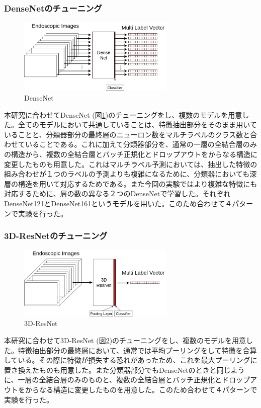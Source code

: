 \subsubsection{DenseNetのチューニング}

\begin{figure}[tb]
    \begin{center}
        \includegraphics[width=75mm]{./fig/ieice2.png}
        \caption{DenseNet}
        \label{fig:densenet}
    \end{center}
\end{figure}

本研究に合わせてDenseNet (図\ref{fig:densenet})のチューニングをし、複数のモデルを用意した。全てのモデルにおいて共通していることは、特徴抽出部分をそのまま用いていることと、分類器部分の最終層のニューロン数をマルチラベルのクラス数と合わせていることである。これに加えて分類器部分を、通常の一層の全結合層のみの構造から、複数の全結合層とバッチ正規化とドロップアウトをからなる構造に変更したものも用意した。これはマルチラベル予測においては、抽出した特徴の組み合わせが１つのラベルの予測よりも複雑になるために、分類器においても深層の構造を用いて対応するためである。また今回の実験ではより複雑な特徴にも対応するために、層の数の異なる２つのDenseNetで学習した。それぞれDenseNet121\cite{DenseNet}とDenseNet161\cite{DenseNet}というモデルを用いた。このため合わせて４パターンで実験を行った。
\subsubsection{3D-ResNetのチューニング}

\begin{figure}[tb]
    \begin{center}
        \includegraphics[width=75mm]{./fig/ieice3.png}
        \caption{3D-ResNet}
        \label{fig:3d_resnet}
    \end{center}
\end{figure}

本研究に合わせて3D-ResNet (図\ref{fig:3d_resnet})のチューニングをし、複数のモデルを用意した。特徴抽出部分の最終層において、通常では平均プーリングをして特徴を合算している。その際に特徴が損失する恐れがあったため、これを最大プーリングに置き換えたものも用意した。また分類器部分でもDenseNetのときと同じように、一層の全結合層のみのものと、複数の全結合層とバッチ正規化とドロップアウトをからなる構造に変更したものを用意した。このため合わせて４パターンで実験を行った。
